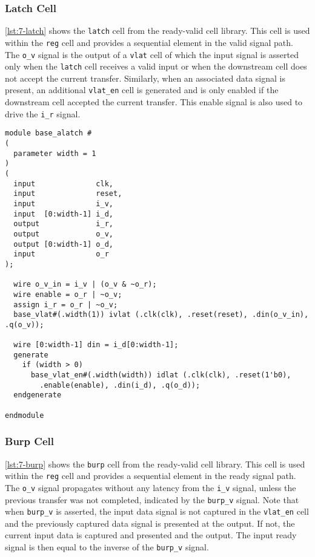 \subsubsection{Latch Cell}
\autoref{lst:7-latch} shows the \texttt{latch} cell from the ready-valid cell library. This cell is used within the \texttt{reg} cell and provides a sequential element in the valid signal path. The \texttt{o\_v} signal is the output of a \texttt{vlat} cell of which the input signal is asserted only when the \texttt{latch} cell receives a valid input or when the downstream cell does not accept the current transfer. Similarly, when an associated data signal is present, an additional \texttt{vlat\_en} cell is generated and is only enabled if the downstream cell accepted the current transfer. This enable signal is also used to drive the \texttt{i\_r} signal.

\begin{lstlisting}[style={verilog-style}, caption=Latch cell from the ready-valid cell library., label=lst:7-latch]
module base_alatch #
(
  parameter width = 1
)
(
  input 	         clk,
  input 	         reset,
  input 	         i_v,
  input  [0:width-1] i_d,
  output 	         i_r,
  output 	         o_v,
  output [0:width-1] o_d,
  input 	         o_r
);

  wire o_v_in = i_v | (o_v & ~o_r);
  wire enable = o_r | ~o_v;
  assign i_r = o_r | ~o_v;
  base_vlat#(.width(1)) ivlat (.clk(clk), .reset(reset), .din(o_v_in), .q(o_v));

  wire [0:width-1] din = i_d[0:width-1];
  generate
    if (width > 0)
      base_vlat_en#(.width(width)) idlat (.clk(clk), .reset(1'b0), 
        .enable(enable), .din(i_d), .q(o_d));
  endgenerate

endmodule
\end{lstlisting}



\subsubsection{Burp Cell}
\autoref{lst:7-burp} shows the \texttt{burp} cell from the ready-valid cell library. This cell is used within the \texttt{reg} cell and provides a sequential element in the ready signal path. The \texttt{o\_v} signal propagates without any latency from the \texttt{i\_v} signal, unless the previous transfer was not completed, indicated by the \texttt{burp\_v} signal. Note that when \texttt{burp\_v} is asserted, the input data signal is not captured in the \texttt{vlat\_en} cell and the previously captured data signal is presented at the output. If not, the current input data is captured and presented and the output. The input ready signal is then equal to the inverse of the \texttt{burp\_v} signal.

